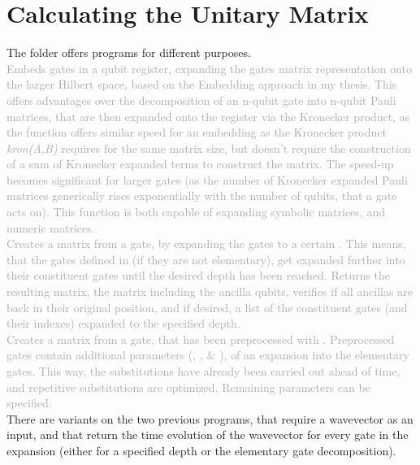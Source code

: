 \section{Calculating the Unitary Matrix}\label{sec:calc_unit}
The folder  offers programs for different purposes. \\

\textbf{} \textcolor{darkgray}{Embeds gates in a qubit register, expanding the gates matrix representation onto the larger Hilbert space, based on the Embedding approach in my thesis. This offers advantages over the decomposition of an n-qubit gate into n-qubit Pauli matrices, that are then expanded onto the register via the Kronecker product, as the function  offers similar speed for an embedding as the Kronecker product \textit{kron(A,B)} requires for the same matrix size, but doesn't require the construction of a sum of Kronecker expanded terms to construct the matrix. The speed-up becomes significant for larger gates (as the number of Kronecker expanded Pauli matrices generically rises exponentially with the number of qubits, that a gate acts on). This function is both capable of expanding symbolic matrices, and numeric matrices. }\\

\textbf{} \textcolor{darkgray}{Creates a matrix from a gate, by expanding the gates to a certain . This means, that the gates defined in  (if they are not elementary), get expanded further into their constituent gates until the desired depth has been reached. Returns the resulting matrix, the matrix including the ancilla qubits, verifies if all ancillas are back in their original position, and if desired, a list of the constituent gates (and their indexes) expanded to the specified depth. }\\

\textbf{} \textcolor{darkgray}{Creates a matrix from a gate, that has been preprocessed with . Preprocessed gates contain additional parameters (, ,  \& ), of an expansion into the elementary gates. This way, the substitutions have already been carried out ahead of time, and repetitive substitutions are optimized. Remaining parameters can be specified. }\\

There are variants on the two previous programs, that require a wavevector as an input, and that return the time evolution of the wavevector for every gate in the expansion (either for a specified depth or the elementary gate decomposition). \\ 

